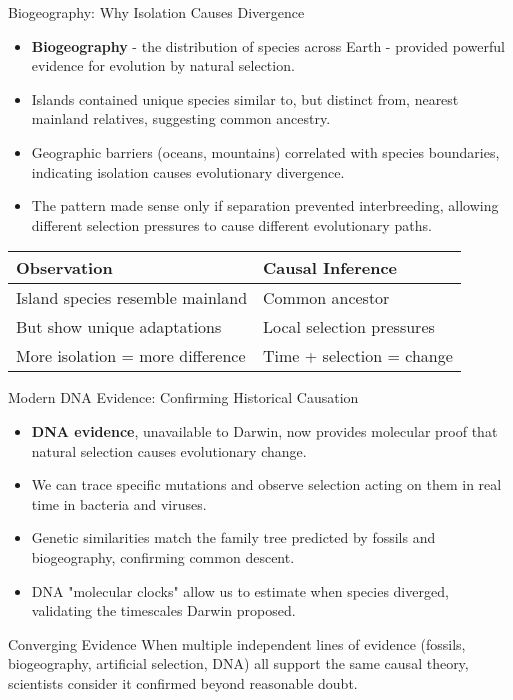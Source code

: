 \documentclass{beamer}
\begin{document}
	\begin{frame}{Biogeography: Why Isolation Causes Divergence}
		\begin{itemize}
			\item \textbf{Biogeography} - the distribution of species across Earth - provided powerful evidence for evolution by natural selection.
			\item Islands contained unique species similar to, but distinct from, nearest mainland relatives, suggesting common ancestry.
			\item Geographic barriers (oceans, mountains) correlated with species boundaries, indicating isolation causes evolutionary divergence.
			\item The pattern made sense only if separation prevented interbreeding, allowing different selection pressures to cause different evolutionary paths.
		\end{itemize}
		
		\begin{example}
			\begin{tabular}{l|l}
				\textbf{Observation} & \textbf{Causal Inference} \\
				\hline
				Island species resemble mainland & Common ancestor \\
				But show unique adaptations & Local selection pressures \\
				More isolation = more difference & Time + selection = change \\
			\end{tabular}
		\end{example}
	\end{frame}
	
	\begin{frame}{Modern DNA Evidence: Confirming Historical Causation}
		\begin{itemize}
			\item \textbf{DNA evidence}, unavailable to Darwin, now provides molecular proof that natural selection causes evolutionary change.
			\item We can trace specific mutations and observe selection acting on them in real time in bacteria and viruses.
			\item Genetic similarities match the family tree predicted by fossils and biogeography, confirming common descent.
			\item DNA "molecular clocks" allow us to estimate when species diverged, validating the timescales Darwin proposed.
		\end{itemize}
		
		\begin{alertblock}{Converging Evidence}
			When multiple independent lines of evidence (fossils, biogeography, artificial selection, DNA) all support the same causal theory, scientists consider it confirmed beyond reasonable doubt.
		\end{alertblock}
	\end{frame}
	
\end{document}
